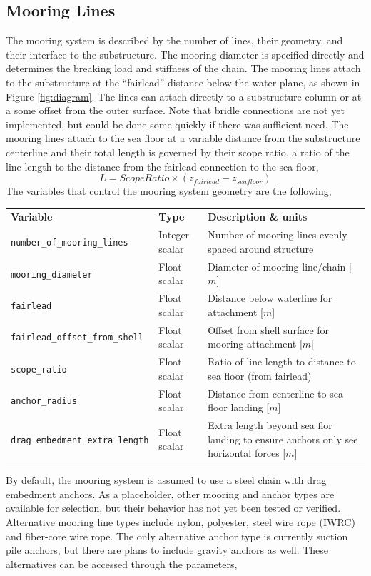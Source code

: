 \subsection{Mooring Lines}
The mooring system is described by the number of lines, their geometry,
and their interface to the substructure.  The mooring diameter is
specified directly and determines the breaking load and stiffness of the
chain.  The mooring lines attach to the substructure at the ``fairlead''
distance below the water plane, as shown in Figure \ref{fig:diagram}.
The lines can attach directly to a substructure column or at a some
offset from the outer surface.  Note that bridle connections are not yet
implemented, but could be done some quickly if there was sufficient
need.  The mooring lines attach to the sea floor at a variable distance
from the substructure centerline and their total length is governed by
their scope ratio, a ratio of the line length to the distance from the
fairlead connection to the sea floor,
\[
  L = ScopeRatio \times \left( z_{fairlead} - z_{seafloor} \right)
\]
The variables that control the mooring system geometry are the following,

{\footnotesize
  \begin{tabularx}{\linewidth}{ l l X }
    \textbf{Variable} & \textbf{Type} & \textbf{Description \& units} \\
    \texttt{number\_of\_mooring\_lines} & Integer scalar & Number of mooring lines evenly spaced around structure\\
    \texttt{mooring\_diameter} & Float scalar & Diameter of mooring line/chain [$m$]\\
    \texttt{fairlead} & Float scalar & Distance below waterline for attachment [$m$]\\
    \texttt{fairlead\_offset\_from\_shell} & Float scalar & Offset from shell surface for mooring attachment [$m$] \\
    \texttt{scope\_ratio} & Float scalar & Ratio of line length to distance to sea floor (from fairlead)\\
    \texttt{anchor\_radius} & Float scalar & Distance from centerline to sea floor landing [$m$]\\
    \texttt{drag\_embedment\_extra\_length} & Float scalar & Extra length beyond sea flor landing to ensure anchors only see horizontal forces [$m$]\\
  \end{tabularx}
}

By default, the mooring system is assumed to use a steel chain with drag
embedment anchors. As a placeholder, other mooring and anchor types are available for
selection, but their behavior has not yet been tested or verified.
Alternative mooring line types include nylon, polyester, steel wire rope
(IWRC) and fiber-core wire rope.  The only alternative anchor type is
currently suction pile anchors, but there are plans to include gravity
anchors as well.  These alternatives can be accessed through the
parameters,

